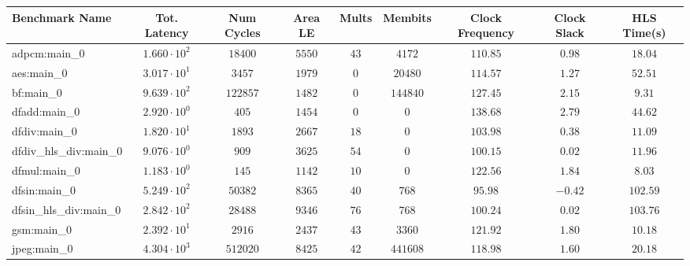 \begin{tabular}{|l|c|c|c|c|c|c|c|c|}
\hline
Benchmark Name          & Tot. Latency           & Num Cycles & Area LE   & Mults   & Membits    & Clock Frequency & Clock Slack & HLS Time(s) \\
\hline
adpcm:main\_0           & $ 1.660 \cdot 10^{2} $ & $ 18400  $ & $ 5550  $ & $ 43  $ & $ 4172   $ & $ 110.85      $ & $ 0.98    $ & $ 18.04   $ \\
aes:main\_0             & $ 3.017 \cdot 10^{1} $ & $ 3457   $ & $ 1979  $ & $ 0   $ & $ 20480  $ & $ 114.57      $ & $ 1.27    $ & $ 52.51   $ \\
bf:main\_0              & $ 9.639 \cdot 10^{2} $ & $ 122857 $ & $ 1482  $ & $ 0   $ & $ 144840 $ & $ 127.45      $ & $ 2.15    $ & $ 9.31    $ \\
dfadd:main\_0           & $ 2.920 \cdot 10^{0} $ & $ 405    $ & $ 1454  $ & $ 0   $ & $ 0      $ & $ 138.68      $ & $ 2.79    $ & $ 44.62   $ \\
dfdiv:main\_0           & $ 1.820 \cdot 10^{1} $ & $ 1893   $ & $ 2667  $ & $ 18  $ & $ 0      $ & $ 103.98      $ & $ 0.38    $ & $ 11.09   $ \\
dfdiv\_hls\_div:main\_0 & $ 9.076 \cdot 10^{0} $ & $ 909    $ & $ 3625  $ & $ 54  $ & $ 0      $ & $ 100.15      $ & $ 0.02    $ & $ 11.96   $ \\
dfmul:main\_0           & $ 1.183 \cdot 10^{0} $ & $ 145    $ & $ 1142  $ & $ 10  $ & $ 0      $ & $ 122.56      $ & $ 1.84    $ & $ 8.03    $ \\
dfsin:main\_0           & $ 5.249 \cdot 10^{2} $ & $ 50382  $ & $ 8365  $ & $ 40  $ & $ 768    $ & $ 95.98       $ & $ -0.42   $ & $ 102.59  $ \\
dfsin\_hls\_div:main\_0 & $ 2.842 \cdot 10^{2} $ & $ 28488  $ & $ 9346  $ & $ 76  $ & $ 768    $ & $ 100.24      $ & $ 0.02    $ & $ 103.76  $ \\
gsm:main\_0             & $ 2.392 \cdot 10^{1} $ & $ 2916   $ & $ 2437  $ & $ 43  $ & $ 3360   $ & $ 121.92      $ & $ 1.80    $ & $ 10.18   $ \\
jpeg:main\_0            & $ 4.304 \cdot 10^{3} $ & $ 512020 $ & $ 8425  $ & $ 42  $ & $ 441608 $ & $ 118.98      $ & $ 1.60    $ & $ 20.18   $ \\

\end{tabular}
